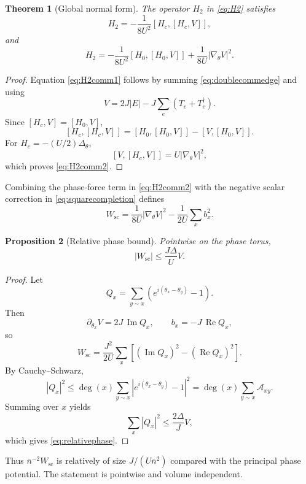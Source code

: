 \documentclass[11pt]{article}
\newtheorem{theorem}{Theorem}[section]
\newtheorem{proposition}[theorem]{Proposition}
\newcommand{\nbar}{\bar n}
\newcommand{\cA}{\mathcal A}
\begin{document}
\begin{theorem}[Global normal form]
The operator $H_2$ in \eqref{eq:H2} satisfies
\begin{equation}
H_2=-\frac1{8U^2}[H_c,[H_c,V]],
\label{eq:H2comm1}
\end{equation}
and
\begin{equation}
H_2=-\frac1{8U^2}[H_0,[H_0,V]]
+\frac1{8U}|\nabla_\theta V|^2.
\label{eq:H2comm2}
\end{equation}
\end{theorem}

\begin{proof}
Equation \eqref{eq:H2comm1} follows by summing \eqref{eq:doublecommedge} and using
\[
V=2J|E|-J\sum_e(T_e+T_e^\dagger).
\]
Since $[H_c,V]=[H_0,V]$,
\[
[H_c,[H_c,V]]=[H_0,[H_0,V]]-[V,[H_0,V]].
\]
For $H_c=-(U/2)\Delta_\theta$,
\[
[V,[H_c,V]]=U|\nabla_\theta V|^2,
\]
which proves \eqref{eq:H2comm2}.
\end{proof}

Combining the phase-force term in \eqref{eq:H2comm2} with the negative scalar correction in \eqref{eq:squarecompletion} defines
\begin{equation}
W_{\mathrm{sc}}
=\frac1{8U}|\nabla_\theta V|^2
-\frac1{2U}\sum_xb_x^2.
\label{eq:Wscdef}
\end{equation}

\begin{proposition}[Relative phase bound]
Pointwise on the phase torus,
\begin{equation}
|W_{\mathrm{sc}}|\le \frac{J\Delta}{U}V.
\label{eq:relativephase}
\end{equation}
\end{proposition}

\begin{proof}
Let
\[
Q_x=\sum_{y\sim x}\left(e^{i(\theta_x-\theta_y)}-1\right).
\]
Then
\[
\partial_{\theta_x}V=2J\,\operatorname{Im}Q_x,
\qquad
b_x=-J\,\operatorname{Re}Q_x,
\]
so
\[
W_{\mathrm{sc}}
=\frac{J^2}{2U}\sum_x
\left[(\operatorname{Im}Q_x)^2-(\operatorname{Re}Q_x)^2\right].
\]
By Cauchy--Schwarz,
\[
|Q_x|^2
\le \deg(x)\sum_{y\sim x}|e^{i(\theta_x-\theta_y)}-1|^2
=\deg(x)\sum_{y\sim x}\cA_{xy}.
\]
Summing over $x$ yields
\[
\sum_x|Q_x|^2\le \frac{2\Delta}{J}V,
\]
which gives \eqref{eq:relativephase}.
\end{proof}

Thus $\nbar^{-2}W_{\mathrm{sc}}$ is relatively of size $J/(U\nbar^2)$ compared with the principal phase potential. The statement is pointwise and volume independent.
\end{document}
